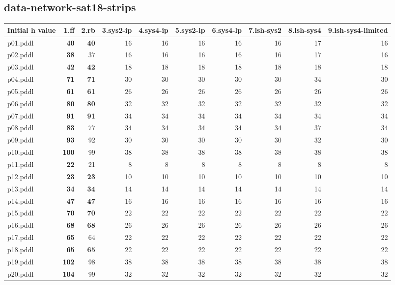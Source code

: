 \documentclass{article}
\begin{document}
\hypertarget{initial_h_value-data-network-sat18-strips}{}
\subsection*{data-network-sat18-strips}

\begin{tabular}{@{}lrrrrrrrrr@{}}
Initial h value & 1.ff & 2.rb & 3.sys2-ip & 4.sys4-ip & 5.sys2-lp & 6.sys4-lp & 7.lsh-sys2 & 8.lsh-sys4 & 9.lsh-sys4-limited \\
\midrule
p01.pddl & \textbf{40} & \textbf{40} & 16 & 16 & 16 & 16 & 16 & 17 & 16 \\
p02.pddl & \textbf{38} & 37 & 16 & 16 & 16 & 16 & 16 & 17 & 16 \\
p03.pddl & \textbf{42} & \textbf{42} & 18 & 18 & 18 & 18 & 18 & 18 & 18 \\
p04.pddl & \textbf{71} & \textbf{71} & 30 & 30 & 30 & 30 & 30 & 34 & 30 \\
p05.pddl & \textbf{61} & \textbf{61} & 26 & 26 & 26 & 26 & 26 & 26 & 26 \\
p06.pddl & \textbf{80} & \textbf{80} & 32 & 32 & 32 & 32 & 32 & 32 & 32 \\
p07.pddl & \textbf{91} & \textbf{91} & 34 & 34 & 34 & 34 & 34 & 34 & 34 \\
p08.pddl & \textbf{83} & 77 & 34 & 34 & 34 & 34 & 34 & 37 & 34 \\
p09.pddl & \textbf{93} & 92 & 30 & 30 & 30 & 30 & 30 & 32 & 30 \\
p10.pddl & \textbf{100} & 99 & 38 & 38 & 38 & 38 & 38 & 38 & 38 \\
p11.pddl & \textbf{22} & 21 & 8 & 8 & 8 & 8 & 8 & 8 & 8 \\
p12.pddl & \textbf{23} & \textbf{23} & 10 & 10 & 10 & 10 & 10 & 10 & 10 \\
p13.pddl & \textbf{34} & \textbf{34} & 14 & 14 & 14 & 14 & 14 & 14 & 14 \\
p14.pddl & \textbf{47} & \textbf{47} & 16 & 16 & 16 & 16 & 16 & 16 & 16 \\
p15.pddl & \textbf{70} & \textbf{70} & 22 & 22 & 22 & 22 & 22 & 22 & 22 \\
p16.pddl & \textbf{68} & \textbf{68} & 26 & 26 & 26 & 26 & 26 & 26 & 26 \\
p17.pddl & \textbf{65} & 64 & 22 & 22 & 22 & 22 & 22 & 22 & 22 \\
p18.pddl & \textbf{65} & \textbf{65} & 22 & 22 & 22 & 22 & 22 & 22 & 22 \\
p19.pddl & \textbf{102} & 98 & 38 & 38 & 38 & 38 & 38 & 38 & 38 \\
p20.pddl & \textbf{104} & 99 & 32 & 32 & 32 & 32 & 32 & 32 & 32 \\
\end{tabular}
\end{document}
